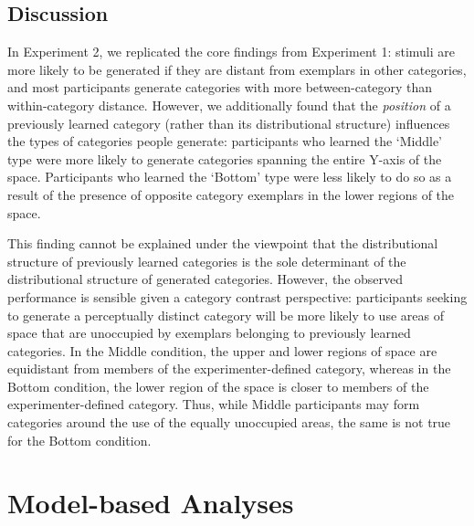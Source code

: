 \documentclass[12pt]{article}
\begin{document}
\begin{flushleft}
\subsection{Discussion}

In Experiment 2, we replicated the core findings from Experiment 1: stimuli are more likely to be generated if they are distant from exemplars in other categories, and most participants generate categories with more between-category than within-category distance. However, we additionally found that the {\em position} of a previously learned category (rather than its distributional structure) influences the types of categories people generate: participants who learned the `Middle' type were more likely to generate categories spanning the entire Y-axis of the space. Participants who learned the `Bottom' type were less likely to do so as a result of the presence of opposite category exemplars in the lower regions of the space.

This finding cannot be explained under the viewpoint that the distributional structure of previously learned categories is the sole determinant of the distributional structure of generated categories. However, the observed performance is sensible given a category contrast perspective: participants seeking to generate a perceptually distinct category will be more likely to use areas of space that are unoccupied by exemplars belonging to previously learned categories. In the Middle condition, the upper and lower regions of space are equidistant from members of the experimenter-defined category, whereas in the Bottom condition, the lower region of the space is closer to members of the experimenter-defined category. Thus, while Middle participants may form categories around the use of the equally unoccupied areas, the same is not true for the Bottom condition.

\section{Model-based Analyses}


\end{flushleft}
\end{document}
